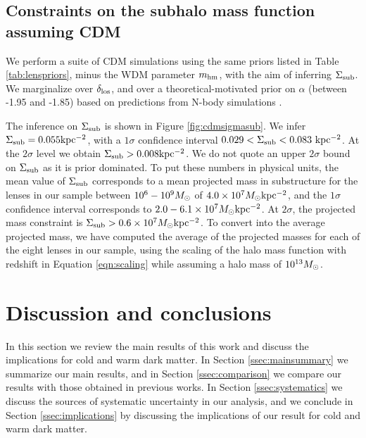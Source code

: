 \subsection{Constraints on the subhalo mass function assuming CDM}

We perform a suite of CDM simulations using the same priors listed in Table \ref{tab:lenspriors}, minus the WDM parameter $m_{\rm{hm}}$, with the aim of inferring $\Sigma_{\rm{sub}}$. We marginalize over $\delta_{\rm{los}}$, and over a theoretical-motivated prior on $\alpha$ (between -1.95 and -1.85) based on predictions from N-body simulations \citep{Springel++08,Fiacconi++16}.

The inference on $\Sigma_{\rm{sub}}$ is shown in Figure \ref{fig:cdmsigmasub}. We infer $\Sigma_{\rm{sub}} = 0.055 \rm{kpc^{-2}}$, with a $1 \sigma$ confidence interval $0.029 < \Sigma_{\rm{sub}} < 0.083 \ \rm{kpc^{-2}}$. At the $2 \sigma$ level we obtain $\Sigma_{\rm{sub}} > 0.008 \rm{kpc^{-2}}$. We do not quote an upper $2\sigma$ bound on $\Sigma_{\rm{sub}}$ as it is prior dominated. To put these numbers in physical units, the mean value of $\Sigma_{\rm{sub}}$ corresponds to a mean projected mass in substructure for the lenses in our sample between $10^6 - 10^{9} {M_{\odot}}$ of $4.0 \times 10^{7} {M_{\odot}} \rm{kpc^{-2}}$, and the $1 \sigma$ confidence interval corresponds to $2.0 - 6.1 \times 10^{7} {M_{\odot}} \rm{kpc^{-2}}$. At $2 \sigma$, the projected mass constraint is $\Sigma_{\rm{sub}} > 0.6 \times 10^{7} {M_{\odot}} \rm{kpc^{-2}}$. To convert into the average projected mass, we have computed the average of the projected masses for each of the eight lenses in our sample, using the scaling of the halo mass function with redshift in Equation \ref{eqn:scaling} while assuming a halo mass of $10^{13} {M_{\odot}}$. 

\section{Discussion and conclusions}
\label{sec:discussion}
In this section we review the main results of this work and discuss the implications for cold and warm dark matter. In Section \ref{ssec:mainsummary} we summarize our main results, and in Section \ref{ssec:comparison} we compare our results with those obtained in previous works. In Section \ref{ssec:systematics} we discuss the sources of systematic uncertainty in our analysis, and we conclude in Section \ref{ssec:implications} by discussing the implications of our result for cold and warm dark matter. 

